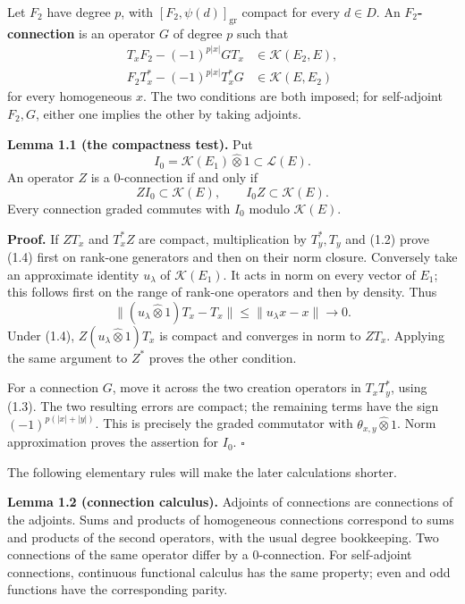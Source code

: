 \documentclass[
  11pt,
]{article}
\begin{document}
Let \(F_2\) have degree \(p\), with \([F_2,\psi(d)]_{\mathrm{gr}}\)
compact for every \(d\in D\). An \textbf{\(F_2\)-connection} is an
operator \(G\) of degree \(p\) such that \[
\begin{aligned}
T_xF_2-(-1)^{p|x|}GT_x&\in\mathcal K(E_2,E),\\
F_2T_x^*-(-1)^{p|x|}T_x^*G&\in\mathcal K(E,E_2)
\end{aligned}
\tag{1.3}
\] for every homogeneous \(x\). The two conditions are both imposed; for
self-adjoint \(F_2,G\), either one implies the other by taking adjoints.

\textbf{Lemma 1.1 (the compactness test).} Put \[
I_0=\mathcal K(E_1)\widehat\otimes1\subset\mathcal L(E).
\] An operator \(Z\) is a \(0\)-connection if and only if \[
ZI_0\subset\mathcal K(E),\qquad I_0Z\subset\mathcal K(E).
\tag{1.4}
\] Every connection graded commutes with \(I_0\) modulo
\(\mathcal K(E)\).

\textbf{Proof.} If \(ZT_x\) and \(T_x^*Z\) are compact, multiplication
by \(T_y^*,T_y\) and (1.2) prove (1.4) first on rank-one generators and
then on their norm closure. Conversely take an approximate identity
\(u_\lambda\) of \(\mathcal K(E_1)\). It acts in norm on every vector of
\(E_1\); this follows first on the range of rank-one operators and then
by density. Thus \[
\|(u_\lambda\widehat\otimes1)T_x-T_x\|
\leq\|u_\lambda x-x\|\longrightarrow0.
\] Under (1.4), \(Z(u_\lambda\widehat\otimes1)T_x\) is compact and
converges in norm to \(ZT_x\). Applying the same argument to \(Z^*\)
proves the other condition.

For a connection \(G\), move it across the two creation operators in
\(T_xT_y^*\), using (1.3). The two resulting errors are compact; the
remaining terms have the sign \((-1)^{p(|x|+|y|)}\). This is precisely
the graded commutator with \(\theta_{x,y}\widehat\otimes1\). Norm
approximation proves the assertion for \(I_0\). \(\square\)

The following elementary rules will make the later calculations shorter.

\textbf{Lemma 1.2 (connection calculus).} Adjoints of connections are
connections of the adjoints. Sums and products of homogeneous
connections correspond to sums and products of the second operators,
with the usual degree bookkeeping. Two connections of the same operator
differ by a \(0\)-connection. For self-adjoint connections, continuous
functional calculus has the same property; even and odd functions have
the corresponding parity.
\end{document}
